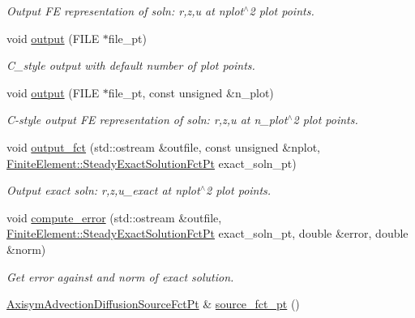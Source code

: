\begin{DoxyCompactItemize}
\begin{DoxyCompactList}\small\item\em Output FE representation of soln\+: r,z,u at nplot$^\wedge$2 plot points. \end{DoxyCompactList}\item 
void \hyperlink{classoomph_1_1AxisymAdvectionDiffusionEquations_a79345d7ee2f42aa679538839b5128a58}{output} (F\+I\+LE $\ast$file\+\_\+pt)
\begin{DoxyCompactList}\small\item\em C\+\_\+style output with default number of plot points. \end{DoxyCompactList}\item 
void \hyperlink{classoomph_1_1AxisymAdvectionDiffusionEquations_ae8f5071aa83c8b71e3d455ae56a25214}{output} (F\+I\+LE $\ast$file\+\_\+pt, const unsigned \&n\+\_\+plot)
\begin{DoxyCompactList}\small\item\em C-\/style output FE representation of soln\+: r,z,u at n\+\_\+plot$^\wedge$2 plot points. \end{DoxyCompactList}\item 
void \hyperlink{classoomph_1_1AxisymAdvectionDiffusionEquations_a7e09458177108a164dbc0dbf45179d0e}{output\+\_\+fct} (std\+::ostream \&outfile, const unsigned \&nplot, \hyperlink{classoomph_1_1FiniteElement_a690fd33af26cc3e84f39bba6d5a85202}{Finite\+Element\+::\+Steady\+Exact\+Solution\+Fct\+Pt} exact\+\_\+soln\+\_\+pt)
\begin{DoxyCompactList}\small\item\em Output exact soln\+: r,z,u\+\_\+exact at nplot$^\wedge$2 plot points. \end{DoxyCompactList}\item 
void \hyperlink{classoomph_1_1AxisymAdvectionDiffusionEquations_a9370e0782ee86c2bc2fe3a083979910b}{compute\+\_\+error} (std\+::ostream \&outfile, \hyperlink{classoomph_1_1FiniteElement_a690fd33af26cc3e84f39bba6d5a85202}{Finite\+Element\+::\+Steady\+Exact\+Solution\+Fct\+Pt} exact\+\_\+soln\+\_\+pt, double \&error, double \&norm)
\begin{DoxyCompactList}\small\item\em Get error against and norm of exact solution. \end{DoxyCompactList}\item 
\hyperlink{classoomph_1_1AxisymAdvectionDiffusionEquations_a5110527308cbe58e90fb9ac146d172a0}{Axisym\+Advection\+Diffusion\+Source\+Fct\+Pt} \& \hyperlink{classoomph_1_1AxisymAdvectionDiffusionEquations_abfa1361d267d17ee38baa667f00b9553}{source\+\_\+fct\+\_\+pt} ()

\end{DoxyCompactItemize}
